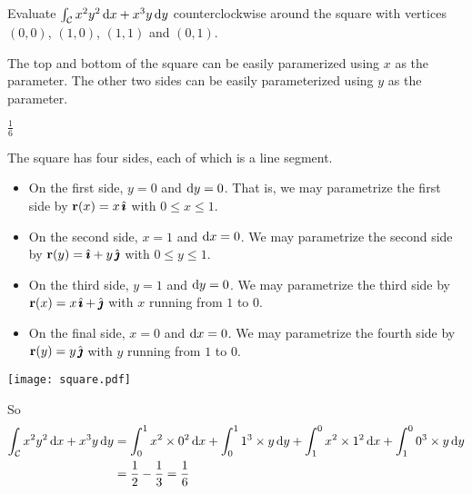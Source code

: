 

\subsection*{\Conceptual}

\begin{question}
Evaluate $\int_{\mathcal{C}} x^2y^2\,\mathrm{d}x+x^3y\,\mathrm{d}y$ counterclockwise around
the square with vertices $(0,0)$, $(1,0)$, $(1,1)$ and $(0,1)$.
\end{question}

\begin{hint}
The top and bottom of the square can be easily paramerized using $x$
as the parameter. The other two sides can be easily parameterized using $y$
as the parameter.
\end{hint}
\begin{answer}
$\frac{1}{6}$
\end{answer}
\begin{solution}
The square has four sides, each of which is a line segment.
\begin{itemize}\itemsep1pt \parskip0pt  %
\item
On the first side, $y=0$ and $\mathrm{d}y=0$. That is, we may parametrize
the first side by $\mathbf{r}(x)=x\,\hat{\pmb{\imath}}$ with $0\le x\le 1$.
\item
On the second side, $x=1$ and $\mathrm{d}x=0$. We may parametrize
the second side by $\mathbf{r}(y)=\hat{\pmb{\imath}}+y\,\hat{\pmb{\jmath}}$ with $0\le y\le 1$.
\item
On the third side, $y=1$ and $\mathrm{d}y=0$. We may parametrize the
third side by $\mathbf{r}(x)=x\,\hat{\pmb{\imath}}+\hat{\pmb{\jmath}}$ with $x$ running from $1$ to $0$. 
\item
On the final side, $x=0$ and $\mathrm{d}x=0$.  We may parametrize the
fourth side by $\mathbf{r}(y)=y\,\hat{\pmb{\jmath}}$ with $y$ running from $1$ to $0$. 
\end{itemize}
\begin{center}
     \texttt{[image: square.pdf]}
\end{center}
So
\begin{align*}
\int_{\mathcal{C}} x^2y^2\,\mathrm{d}x+x^3y\,\mathrm{d}y 
&=\int_0^1 x^2\times 0^2\,\mathrm{d}x +\int_0^1 1^3\times y\,\mathrm{d}y
+\int_1^0 x^2\times 1^2\,\mathrm{d}x +\int_1^0 0^3\times y\,\mathrm{d}y \\
&=\frac{1}{2}-\frac{1}{3}
=\frac{1}{6}
\end{align*}

\end{solution}



